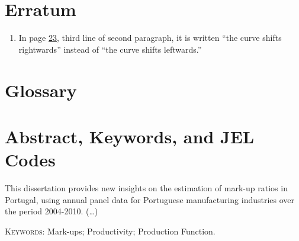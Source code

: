 \documentclass [12pt,a4paper,oneside]{article}
\begin{document}
	\newpage %
	\thispagestyle{plain}%
\section*{Erratum}

\begin{enumerate}
\item	In page \hyperlink{page.23}{23}, third line of second paragraph, it is written “the curve shifts rightwards” instead of “the curve shifts leftwards.”
\end{enumerate}


	\newpage %
	\thispagestyle{plain}%
\section*{Glossary}

\glsaddall
\printglossaries


	\newpage %
	\thispagestyle{plain}%
\section*{Abstract, Keywords, and JEL Codes}

This dissertation provides new insights on the estimation of mark-up ratios in Portugal, using annual panel data for Portuguese manufacturing industries over the period 2004-2010. (…)

\textsc{Keywords}: Mark-ups; Productivity; Production Function.
\end{document}
